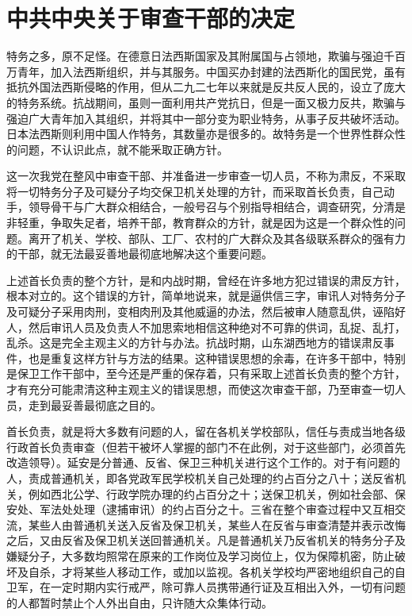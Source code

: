 \section[中共中央关于审查干部的决定（一九四三年八月十五日）]{中共中央关于审查干部的决定}


特务之多，原不足怪。在德意日法西斯国家及其附属国与占领地，欺骗与强迫千百万青年，加入法西斯组织，并与其服务。中国买办封建的法西斯化的国民党，虽有抵抗外国法西斯侵略的作用，但从二九二七年以来就是反共反人民的，设立了庞大的特务系统。抗战期间，虽则一面利用共产党抗日，但是一面又极力反共，欺骗与强迫广大青年加入其组织，并将其中一部分变为职业特务，从事子反共破坏活动。日本法西斯则利用中国人作特务，其数量亦是很多的。故特务是一个世界性群众性的问题，不认识此点，就不能釆取正确方针。

这一次我党在整风中审查干部、并准备进一步审查一切人员，不称为肃反，不采取将一切特务分子及可疑分子均交保卫机关处理的方针，而采取首长负责，自己动手，领导骨干与广大群众相结合，一般号召与个别指导相结合，调查研究，分清是非轻重，争取失足者，培养干部，教育群众的方针，就是因为这是一个群众性的问题。离开了机关、学校、部队、工厂、农村的广大群众及其各级联系群众的强有力的干部，就无法最妥善地最彻底地解决这个重要问题。

上述首长负责的整个方针，是和内战时期，曾经在许多地方犯过错误的肃反方针，根本对立的。这个错误的方针，简单地说来，就是逼供信三字，审讯人对特务分子及可疑分子采用肉刑，变相肉刑及其他威逼的办法，然后被审人随意乱供，诬陷好人，然后审讯人员及负责人不加思索地相信这种绝对不可靠的供词，乱捉、乱打，乱杀。这是完全主观主义的方针与办法。抗战时期，山东湖西地方的错误肃反事件，也是重复这样方针与方法的结果。这种错误思想的余毒，在许多干部中，特别是保卫工作干部中，至今还是严重的保存着，只有采取上述首长负责的整个方针，才有充分可能肃清这种主观主义的错误思想，而使这次审查干部，乃至审查一切人员，走到最妥善最彻底之目的。

首长负责，就是将大多数有问题的人，留在各机关学校部队，信任与责成当地各级行政首长负责审查（但若干被坏人掌握的部门不在此例，对于这些部门，必须首先改造领导）。延安是分普通、反省、保卫三种机关进行这个工作的。对于有问题的人，责成普通机关，即各党政军民学校机关自己处理的约占百分之八十；送反省机关，例如西北公学、行政学院办理的约占百分之十；送保卫机关，例如社会部、保安处、军法处处理（逮捕审讯）的约占百分之十。三省在整个审查过程中又互相交流，某些人由普通机关送入反省及保卫机关，某些人在反省与审查清楚并表示改悔之后，又由反省及保卫机关送回普通机关。凡是普通机关乃反省机关的特务分子及嫌疑分子，大多数均照常在原来的工作岗位及学习岗位上，仅为保障机密，防止破坏及自杀，才将某些人移动工作，或加以监视。各机关学校均严密地组织自己的自卫军，在一定时期内实行戒严，除可靠人员携带通行证及互相出入外，一切有问题的人都暂时禁止个人外出自由，只许随大众集体行动。

